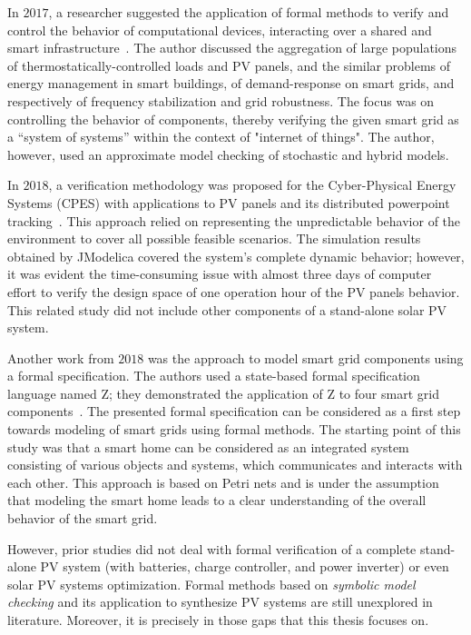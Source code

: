 In $2017$, a researcher suggested the application of formal methods to verify and control the behavior of computational devices, interacting over a shared and smart infrastructure~\cite{Abate2017}. The author discussed the aggregation of large populations of thermostatically-controlled loads and PV panels, and the similar problems of energy management in smart buildings, of demand-response on smart grids, and respectively of frequency stabilization and grid robustness. The focus was on controlling the behavior of components, thereby verifying the given smart grid as a ``system of systems'' within the context of "internet of things". The author, however, used an approximate model checking of stochastic and hybrid models.

In $2018$, a verification methodology was proposed for the Cyber-Physical Energy Systems (CPES) with applications to PV panels and its distributed powerpoint tracking~\cite{Driouich2018}. This approach relied on representing the unpredictable behavior of the environment to cover all possible feasible scenarios. The simulation results obtained by JModelica covered the system's complete dynamic behavior; however, it was evident the time-consuming issue with almost three days of computer effort to verify the design space of one operation hour of the PV panels behavior. This related study did not include other components of a stand-alone solar PV system.

Another work from $2018$ was the approach to model smart grid components using a formal specification. The authors used a state-based formal specification language named Z; they demonstrated the application of Z to four smart grid components~\cite{Akram2018}. The presented formal specification can be considered as a first step towards modeling of smart grids using formal methods. The starting point of this study was that a smart home can be considered as an integrated system consisting of various objects and systems, which communicates and interacts with each other. This approach is based on Petri nets and is under the assumption that modeling the smart home leads to a clear understanding of the overall behavior of the smart grid.

However, prior studies did not deal with formal verification of a complete stand-alone PV system (with batteries, charge controller, and power inverter) or even solar PV systems optimization. Formal methods based on \textit{symbolic model checking} and its application to synthesize PV systems are still unexplored in literature. Moreover, it is precisely in those gaps that this thesis focuses on.

